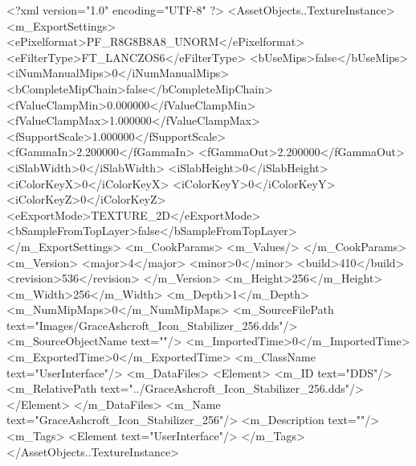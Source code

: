 <?xml version="1.0" encoding="UTF-8" ?>
<AssetObjects..TextureInstance>
	<m_ExportSettings>
		<ePixelformat>PF_R8G8B8A8_UNORM</ePixelformat>
		<eFilterType>FT_LANCZOS6</eFilterType>
		<bUseMips>false</bUseMips>
		<iNumManualMips>0</iNumManualMips>
		<bCompleteMipChain>false</bCompleteMipChain>
		<fValueClampMin>0.000000</fValueClampMin>
		<fValueClampMax>1.000000</fValueClampMax>
		<fSupportScale>1.000000</fSupportScale>
		<fGammaIn>2.200000</fGammaIn>
		<fGammaOut>2.200000</fGammaOut>
		<iSlabWidth>0</iSlabWidth>
		<iSlabHeight>0</iSlabHeight>
		<iColorKeyX>0</iColorKeyX>
		<iColorKeyY>0</iColorKeyY>
		<iColorKeyZ>0</iColorKeyZ>
		<eExportMode>TEXTURE_2D</eExportMode>
		<bSampleFromTopLayer>false</bSampleFromTopLayer>
	</m_ExportSettings>
	<m_CookParams>
		<m_Values/>
	</m_CookParams>
	<m_Version>
		<major>4</major>
		<minor>0</minor>
		<build>410</build>
		<revision>536</revision>
	</m_Version>
	<m_Height>256</m_Height>
	<m_Width>256</m_Width>
	<m_Depth>1</m_Depth>
	<m_NumMipMaps>0</m_NumMipMaps>
	<m_SourceFilePath text="Images/GraceAshcroft_Icon_Stabilizer_256.dds"/>
	<m_SourceObjectName text=""/>
	<m_ImportedTime>0</m_ImportedTime>
	<m_ExportedTime>0</m_ExportedTime>
	<m_ClassName text="UserInterface"/>
	<m_DataFiles>
		<Element>
			<m_ID text="DDS"/>
			<m_RelativePath text="../GraceAshcroft_Icon_Stabilizer_256.dds"/>
		</Element>
	</m_DataFiles>
	<m_Name text="GraceAshcroft_Icon_Stabilizer_256"/>
	<m_Description text=""/>
	<m_Tags>
		<Element text="UserInterface"/>
	</m_Tags>
</AssetObjects..TextureInstance>
